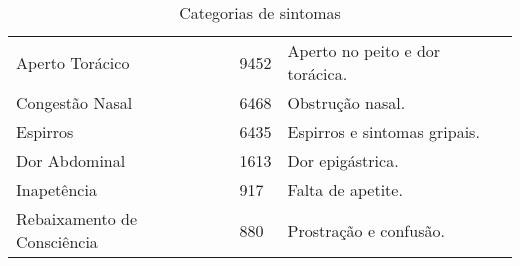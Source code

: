 \begin{table}[H]
\begin{tabular}{lll}
    Aperto Torácico                          & 9452                                         & Aperto no peito e dor torácica.           \\
    Congestão Nasal                          & 6468                                         & Obstrução nasal.                          \\
    Espirros                                 & 6435                                         & Espirros e sintomas gripais.              \\
    Dor Abdominal                            & 1613                                         & Dor epigástrica.                          \\
    Inapetência                               & 917                                          & Falta de apetite.                         \\
    Rebaixamento de Consciência              & 880                                          & Prostração e confusão.                   
    \end{tabular}
    \caption{Categorias de sintomas}
    \label{tbl:tabela-sintomas}  
    \end{table}
